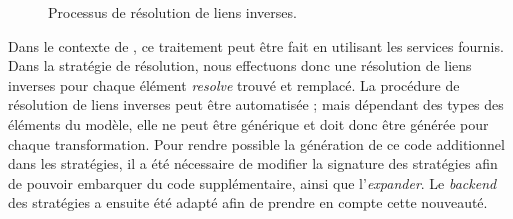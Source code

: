 \begin{figure}[h]
    \begin{subfigure}{0.21\textwidth}
      
      \subcaption{}
      \label{fig:resolutionInverse-a}
    \end{subfigure} 
    \quad
    \begin{subfigure}{0.21\textwidth}
      
      \subcaption{}
      \label{fig:resolutionInverse-b}
    \end{subfigure}
    \quad
    \begin{subfigure}{0.21\textwidth}
      
      \subcaption{}
      \label{fig:resolutionInverse-c}
    \end{subfigure}
    \quad
    \begin{subfigure}{0.21\textwidth}
      
      \subcaption{}
      \label{fig:resolutionInverse-d}
    \end{subfigure}
  \caption{Processus de résolution de liens inverses.}%
  \label{fig:resolutionInverse}
\end{figure}

Dans le contexte de {\emf}, ce traitement peut être fait en utilisant les
services fournis. Dans la stratégie de résolution, nous effectuons donc une
résolution de liens inverses pour chaque élément \emph{resolve} trouvé et
remplacé. La procédure de résolution de liens inverses peut être automatisée ;
mais dépendant des types des éléments du modèle, elle ne peut être générique et
doit donc être générée pour chaque transformation. Pour rendre possible la
génération de ce code additionnel dans les stratégies, il a été nécessaire de
modifier la signature des stratégies afin de pouvoir embarquer du code
supplémentaire, ainsi que l'\emph{expander}. Le \emph{backend} des stratégies a
ensuite été adapté afin de prendre en compte cette nouveauté.

